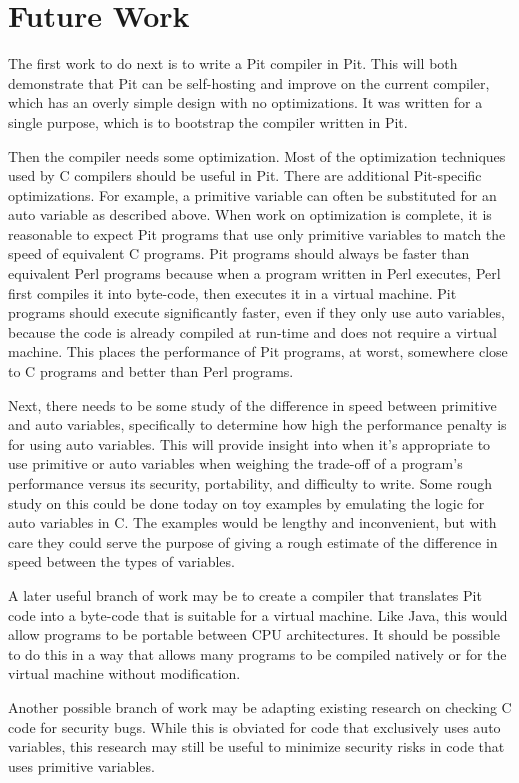 \section{Future Work}

The first work to do next is to write a Pit compiler in Pit.  This will both demonstrate that Pit can be self-hosting
and improve on the current compiler, which has an overly simple design with no optimizations.  It was written for a
single purpose, which is to bootstrap the compiler written in Pit.

Then the compiler needs some optimization.  Most of the optimization techniques used by C compilers should be useful in
Pit.  There are additional Pit-specific optimizations.  For example, a primitive variable can often be substituted for
an auto variable as described above.  When work on optimization is complete, it is reasonable to expect Pit programs
that use only primitive variables to match the speed of equivalent C programs.  Pit programs should always be faster
than equivalent Perl programs because when a program written in Perl executes, Perl first compiles it into byte-code,
then executes it in a virtual machine.  Pit programs should execute significantly faster, even if they only use auto
variables, because the code is already compiled at run-time and does not require a virtual machine.  This places the
performance of Pit programs, at worst, somewhere close to C programs and better than Perl programs.

Next, there needs to be some study of the difference in speed between primitive and auto variables, specifically to
determine how high the performance penalty is for using auto variables.  This will provide insight into when it's appropriate
to use primitive or auto variables when weighing the trade-off of a program's performance versus its security,
portability, and difficulty to write.  Some rough study on this could be done today on toy examples by emulating
the logic for auto variables in C.  The examples would be lengthy and inconvenient, but with care they could serve the
purpose of giving a rough estimate of the difference in speed between the types of variables.

A later useful branch of work may be to create a compiler that translates Pit code into a byte-code that is suitable
for a virtual machine.  Like Java, this would allow programs to be portable between CPU architectures.  It should be
possible to do this in a way that allows many programs to be compiled natively or for the virtual machine without
modification.

Another possible branch of work may be adapting existing research on checking C code for security bugs.  While this is
obviated for code that exclusively uses auto variables, this research may still be useful to minimize security risks in
code that uses primitive variables.
